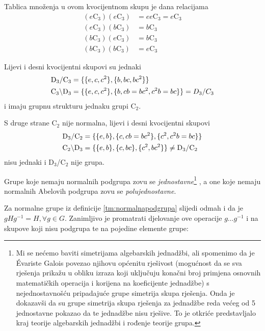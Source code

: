 \begin{primjer}
Tablica množenja u ovom kvocijentnom skupu je dana relacijama
\begin{align}
    (e\mathrm{C}_3)(e\mathrm{C}_3) &= ee \mathrm{C}_3 = e\mathrm{C}_3\\
    (e\mathrm{C}_3)(b\mathrm{C}_3) &= b\mathrm{C}_3  \\
    (b\mathrm{C}_3)(e\mathrm{C}_3) &= b\mathrm{C}_3  \\
    (b\mathrm{C}_3)(b\mathrm{C}_3) &= e\mathrm{C}_3 
\end{align}

Lijevi i desni kvocijentni skupovi su jednaki
\begin{align*}
{\rm D}_{3}/{\rm C}_3 &= \{\{e,c,c^2\}, \{b, bc, bc^2\}\} \\
{\rm C}_3\backslash{\rm D}_{3} &= \{\{e,c,c^2\}, \{b, cb=bc^2, c^2b=bc\}\}
    = D_{3}/C_3
\end{align*}
i imaju grupnu strukturu jednaku grupi $\mathrm{C}_2$.
\label{pr:D3oC3}
\end{primjer}

S druge strane $\mathrm{C}_2$ nije normalna, lijevi i desni kvocijentni
skupovi
\begin{align*}
{\rm D}_{3}/{\rm C}_2 &= \{\{e,b\}, \{c, cb=bc^2\}, \{c^2, c^2b=bc\}\} \\
{\rm C}_2\backslash{\rm D}_{3} &= \{\{e,b\}, \{c, bc\}, \{c^2, bc^2\}\}
    \neq {\rm D}_{3}/{\rm C}_2
\end{align*}
nisu jednaki i $\mathrm{D}_{3}$/$\mathrm{C}_2$ nije grupa.

Grupe koje nemaju normalnih podgrupa zovu se \emph{jednostavne}\footnote{Mi se
    nećemo baviti simetrijama algebarskih jednadžbi, ali spomenimo
    da je \'{E}variste Galois povezao njihovu općenitu rješivost (mogućnost
    da se sva rješenja prikažu u obliku izraza koji uključuju konačni broj
    primjena osnovnih matematičkih operacija i korijena na
    koeficijente jednadžbe) s nejednostavnošću pripadajuće grupe simetrija
    skupa rješenja. Onda je dokazavši da su grupe simetrija skupa rješenja za jednadžbe reda
    većeg od 5 jednostavne pokazao da te jednadžbe nisu rješive. To je otkriće predstavljalo
kraj teorije algebarskih jednadžbi i rođenje teorije grupa.\label{fus:galois}} ,
a one koje nemaju normalnih Abelovih podgrupa zovu se \emph{polujednostavne}.

Za normalne grupe iz definicije \ref{tm:normalnapodgrupa} slijedi odmah i
da je $g H g^{-1} = H, \forall g\in G$. Zanimljivo je promatrati djelovanje
ove operacije $g \ldots g^{-1}$ i na skupove koji nisu podgrupa te
na pojedine elemente grupe:

